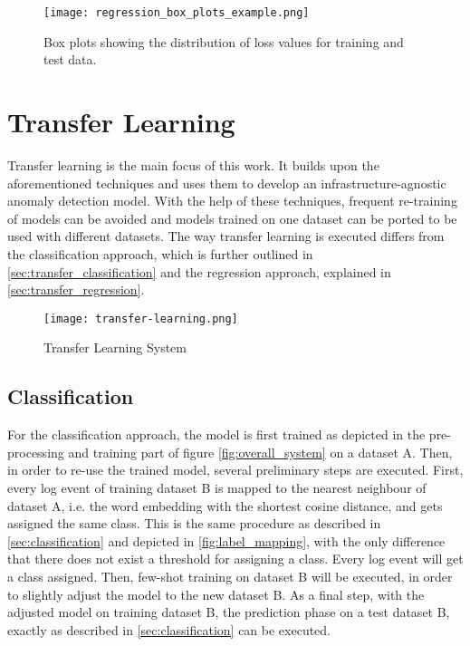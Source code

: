 \begin{figure}[htb]
  \centering
  \texttt{[image: regression\_box\_plots\_example.png]} \\
  \caption{Box plots showing the distribution of loss values for training and test data.}
  \label{fig:regression_with_threshold}
\end{figure}


\section{Transfer Learning \label{sec:transferlearning}}
Transfer learning is the main focus of this work. It builds upon the aforementioned techniques and uses them to develop an infrastructure-agnostic anomaly detection model. With the help of these techniques, frequent re-training of models can be avoided and models trained on one dataset can be ported to be used with different datasets. The way transfer learning is executed differs from the classification approach, which is further outlined in \ref{sec:transfer_classification} and the regression approach, explained in \ref{sec:transfer_regression}. 

\begin{figure}[H]
	\centering
	\texttt{[image: transfer-learning.png]}
	\caption{Transfer Learning System}
	\label{fig:transfer_learning_system}
\end{figure}

\subsection{Classification \label{sec:transfer_classification}}
For the classification approach, the model is first trained as depicted in the pre-processing and training part of figure \ref{fig:overall_system} on a dataset A. Then, in order to re-use the trained model, several preliminary steps are executed. First, every log event of training dataset B is mapped to the nearest neighbour of dataset A, i.e. the word embedding with the shortest cosine distance, and gets assigned the same class. This is the same procedure as described in \ref{sec:classification} and depicted in \ref{fig:label_mapping}, with the only difference that there does not exist a threshold for assigning a class. Every log event will get a class assigned. Then, few-shot training on dataset B will be executed, in order to slightly adjust the model to the new dataset B. As a final step, with the adjusted model on training dataset B, the prediction phase on a test dataset B, exactly as described in \ref{sec:classification} can be executed.

